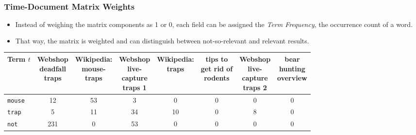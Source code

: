             \subsubsection{Time-Document Matrix Weights} %
            	\begin{itemize}
            		\item Instead of weighing the matrix components as 1 or 0, each field can be assigned the \textit{Term Frequency}, the occurrence count of a word.
            		\item That way, the matrix is weighted and can distinguish between not-so-relevant and relevant results.
            	\end{itemize}
                \begin{table}[H]
                    \centering
                    \begin{tabular}{|l|c|c|c|c|c|c|c|}
                        \hline
                        \textbf{Term} \(t\) & \makecell{Webshop \\ deadfall \\ traps} & \makecell{Wikipedia: \\ mouse- \\ traps} & \makecell{Webshop \\ live- \\ capture \\ traps 1} & \makecell{Wikipedia: \\ traps} & \makecell{tips to \\ get rid of \\ rodents} & \makecell{Webshop \\ live- \\ capture \\ traps 2} & \makecell{bear \\ hunting \\ overview} \\ \hline
                        \texttt{mouse}  &         12         &         53         &         3          & \textcolor{irl}{0} & \textcolor{irl}{0} & \textcolor{irl}{0} & \textcolor{irl}{0} \\ \hline
                        \texttt{trap}   &         5          &         11         &         34         &         10         & \textcolor{irl}{0} &         8          & \textcolor{irl}{0} \\ \hline
                        \texttt{not}    &        231         & \textcolor{irl}{0} &         53         & \textcolor{irl}{0} & \textcolor{irl}{0} & \textcolor{irl}{0} & \textcolor{irl}{0} \\ \hline

\end{tabular}
\end{table}
